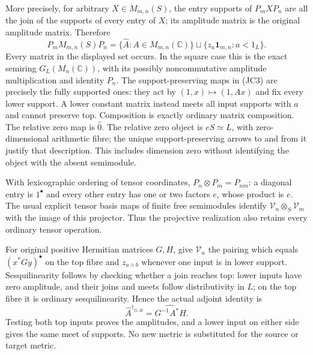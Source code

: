 More precisely, for arbitrary $X\in M_{m,n}(S)$, the entry supports
of $P_mXP_n$ are all the join of the supports of every entry of $X$;
its amplitude matrix is the original amplitude matrix. Therefore
\[
 P_mM_{m,n}(S)P_n
 =\{\widehat A:A\in M_{m,n}(\mathbb C)\}
       \sqcup\{z_a\mathbf1_{m,n}:a<1_L\}.
 \tag{JC3}
\]
Every matrix in the displayed set occurs. In the square case this
is the exact semiring $G_L(M_n(\mathbb C))$, with its possibly
noncommutative amplitude multiplication and identity $P_n$.
The support-preserving maps in (JC3) are precisely the fully
supported ones: they act by $(1,x)\mapsto(1,Ax)$ and fix every
lower support. A lower constant matrix instead meets all input
supports with $a$ and cannot preserve top. Composition is exactly
ordinary matrix composition. The relative zero map is $\widehat0$.
The relative zero object is $eS\simeq L$, with zero-dimensional
arithmetic fibre; the unique support-preserving arrows to and from
it justify that description. This includes dimension zero without
identifying the object with the absent semimodule.

With lexicographic ordering of tensor coordinates,
$P_n\otimes P_m=P_{nm}$: a diagonal entry is $1^\bullet$ and
every other entry has one or two factors $e$, whose product is $e$.
The usual explicit tensor basis maps of finite free semimodules
identify $\mathcal V_n\otimes_S\mathcal V_m$ with the image of
this projector. Thus the projective realization also retains every
ordinary tensor operation.

For original positive Hermitian matrices $G,H$, give $\mathcal V_n$
the pairing which equals $(x^*Gy)^\bullet$ on the top fibre and
$z_{a\wedge b}$ whenever one input is in lower support.
Sesquilinearity follows by checking whether a join reaches top:
lower inputs have zero amplitude, and their joins and meets follow
distributivity in $L$; on the top fibre it is ordinary
sesquilinearity. Hence the actual adjoint identity is
\[
 \widehat A^{\dagger_{G,H}}=\widehat{G^{-1}A^*H}.
 \tag{JC4}
\]
Testing both top inputs proves the amplitudes, and a lower input
on either side gives the same meet of supports. No new metric
is substituted for the source or target metric.

